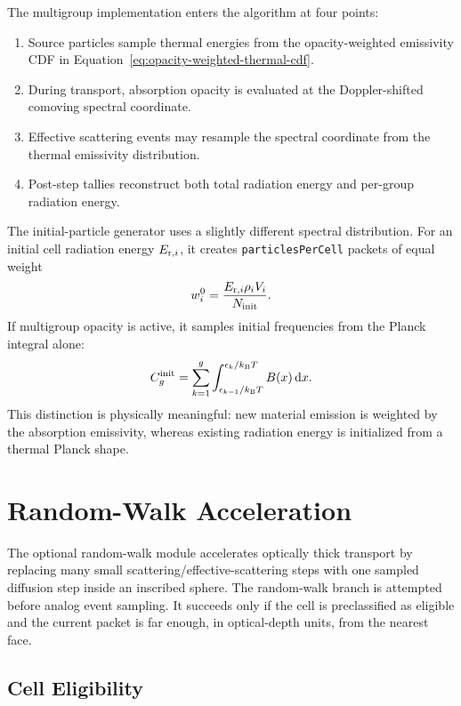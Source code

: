 \documentclass[11pt]{article}
\newcounter{algorithm}
\newcommand{\dd}{\mathrm{d}}
\begin{document}
The multigroup implementation enters the algorithm at four points:
\begin{enumerate}
\item Source particles sample thermal energies from the opacity-weighted
emissivity CDF in Equation~\eqref{eq:opacity-weighted-thermal-cdf}.
\item During transport, absorption opacity is evaluated at the Doppler-shifted
comoving spectral coordinate.
\item Effective scattering events may resample the spectral coordinate from
the thermal emissivity distribution.
\item Post-step tallies reconstruct both total radiation energy and per-group
radiation energy.
\end{enumerate}

The initial-particle generator uses a slightly different spectral distribution.
For an initial cell radiation energy \(E_{{\rm r},i}\), it creates
\texttt{particlesPerCell} packets of equal weight
\begin{equation}
  w_i^{0} =
  \frac{E_{{\rm r},i}\rho_i V_i}{N_{\rm init}}.
\end{equation}
If multigroup opacity is active, it samples initial frequencies from the Planck
integral alone:
\begin{equation}
  C_g^{\rm init}
  =
  \sum_{k=1}^{g}
  \int_{\epsilon_{k-1}/k_{\rm B}T}^{\epsilon_k/k_{\rm B}T}
  B(x)\,\dd x .
\end{equation}
This distinction is physically meaningful: new material emission is weighted
by the absorption emissivity, whereas existing radiation energy is initialized
from a thermal Planck shape.

\section{Random-Walk Acceleration}

The optional random-walk module accelerates optically thick transport by
replacing many small scattering/effective-scattering steps with one sampled
diffusion step inside an inscribed sphere. The random-walk branch is attempted
before analog event sampling. It succeeds only if the cell is preclassified as
eligible and the current packet is far enough, in optical-depth units, from the
nearest face.

\subsection{Cell Eligibility}
\end{document}
